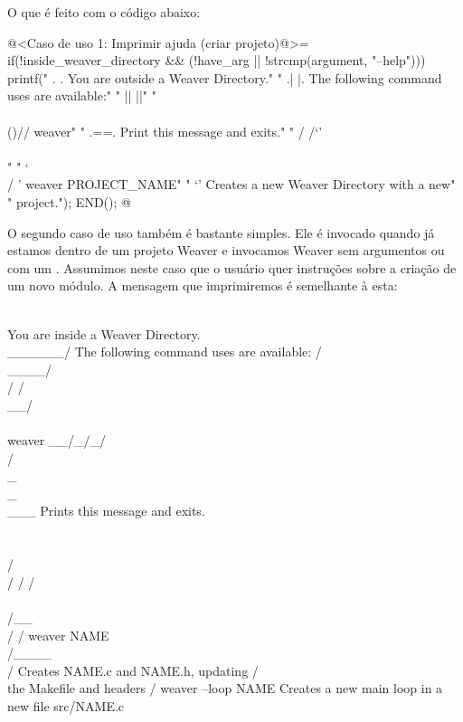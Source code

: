 {O que é feito com o código abaixo:


\iniciocodigo
@<Caso de uso 1: Imprimir ajuda (criar projeto)@>=
if(!inside_weaver_directory && (!have_arg || !strcmp(argument, "--help"))){
  printf("    .  .     You are outside a Weaver Directory.\n"
  "   .|  |.    The following command uses are available:\n"
  "   ||  ||\n"
  "   \\\\()//  weaver\n"
  "   .={}=.      Print this message and exits.\n"
  "  / /`'\\ \\\n"
  "  ` \\  / '  weaver PROJECT_NAME\n"
  "     `'        Creates a new Weaver Directory with a new\n"
  "               project.\n");
  END();
}
@
\fimcodigo



O segundo caso de uso também é bastante simples. Ele é invocado quando
já estamos dentro de um projeto Weaver e invocamos Weaver sem
argumentos ou com um . Assumimos neste caso que o
usuário quer instruções sobre a criação de um novo módulo. A mensagem
que imprimiremos é semelhante à esta:

\alinhaverbatim
       \\              You are inside a Weaver Directory.
        \\______/      The following command uses are available:
        /\\____/\\
       / /\\__/\\ \\       weaver
    __/_/_/\\/\\_\\_\\___     Prints this message and exits.
      \\ \\ \\/\\/ / /
       \\ \\/__\\/ /       weaver NAME
        \\/____\\/          Creates NAME.c and NAME.h, updating
        /      \\          the Makefile and headers
       /
                          weaver --loop NAME
                           Creates a new main loop in a new file src/NAME.c

}
